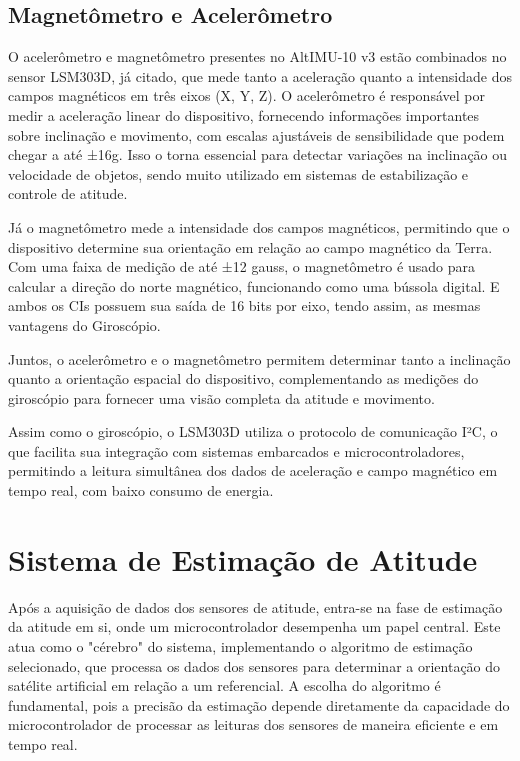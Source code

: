 \documentclass[
	12pt,				%
	openright,			%
	oneside,			%
	a4paper,			%
	english,			%
	brazil				%
	]{abntex2}
\begin{document}
\section{Magnetômetro e Acelerômetro}
O acelerômetro e magnetômetro presentes no AltIMU-10 v3 estão combinados no sensor LSM303D, já citado, que mede tanto a aceleração quanto a intensidade dos campos magnéticos em três eixos (X, Y, Z). O acelerômetro é responsável por medir a aceleração linear do dispositivo, fornecendo informações importantes sobre inclinação e movimento, com escalas ajustáveis de sensibilidade que podem chegar a até ±16g. Isso o torna essencial para detectar variações na inclinação ou velocidade de objetos, sendo muito utilizado em sistemas de estabilização e controle de atitude.

Já o magnetômetro mede a intensidade dos campos magnéticos, permitindo que o dispositivo determine sua orientação em relação ao campo magnético da Terra. Com uma faixa de medição de até ±12 gauss, o magnetômetro é usado para calcular a direção do norte magnético, funcionando como uma bússola digital. E ambos os CIs possuem sua saída de 16 bits por eixo, tendo assim, as mesmas vantagens do Giroscópio.

Juntos, o acelerômetro e o magnetômetro permitem determinar tanto a inclinação quanto a orientação espacial do dispositivo, complementando as medições do giroscópio para fornecer uma visão completa da atitude e movimento.

Assim como o giroscópio, o LSM303D utiliza o protocolo de comunicação I²C, o que facilita sua integração com sistemas embarcados e microcontroladores, permitindo a leitura simultânea dos dados de aceleração e campo magnético em tempo real, com baixo consumo de energia.

\chapter{Sistema de Estimação de Atitude}

Após a aquisição de dados dos sensores de atitude, entra-se na fase de estimação da atitude em si, onde um microcontrolador desempenha um papel central. Este atua como o "cérebro" do sistema, implementando o algoritmo de estimação selecionado, que processa os dados dos sensores para determinar a orientação do satélite artificial em relação a um referencial. A escolha do algoritmo é fundamental, pois a precisão da estimação depende diretamente da capacidade do microcontrolador de processar as leituras dos sensores de maneira eficiente e em tempo real.
\end{document}
